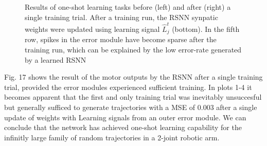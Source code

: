 \documentclass[letterpaper, 10 pt, conference]{ieeeconf}  %
\begin{document}
\begin{figure}[thpb]
        \centering
\caption{Results of one-shot learning tasks before (left) and after (right) a single training trial. After a training run, the RSNN 
synpatic weights were updated using learning signal $\hat{L}^t_j$ (bottom). In the fifth row, spikes in the error module have become sparse after
the training run, which can be explained by the low error-rate generated by a learned RSNN \cite{bellecBiologicallyInspiredAlternatives2019}}
        \label{figurelabel}
        \end{figure}

Fig. 17 shows the result of the motor outputs by the RSNN after a single training trial, provided the error modules experienced sufficient training.
In plots 1-4 it becomes apparent that the first and only training trial was inevitably unsuccesful but generally sufficed to generate trajectories
 with a MSE of 0.003 after a single update of weights with Learning signals from an outer error module. We can 
conclude that the network has achieved one-shot learning capability for the infinitly large family of random trajectories in a 2-joint robotic arm.
\end{document}
